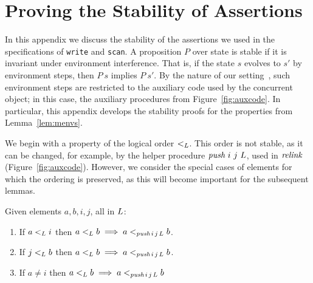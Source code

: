 \section{Proving the Stability of Assertions}
\label{sc:coq-code}

\def\cat{{\mathrel{+\!\!+}}}

\begin{comment}
\begin{itemize}
\item Describe stability proofs in general
\item Show Push mono Lemma in roder to justify $\tle$ not being
       stable, we will use this lemma later on
\item Present the {\sf Prefix} lemma connecting the
  $\chainjleq{t}{\ordlist}$ to $\chaintleq{t}{\ordlist}$
\item Present the {\sf Prefix} lemma connecting the
       $H^{\hbox{}\sqsubseteq_\ordlist t}$

\end{itemize}
\end{comment}

In this appendix we discuss the stability of the assertions we used in
the specifications of {\tt write} and {\tt scan}. A proposition $P$
over state is stable if it is invariant under environment
interference. That is, if the state $s$ evolves to $s'$ by environment
steps, then $P\ s$ implies $P\ s'$. By the nature of our
setting~\cite{Nanevski-al:ESOP14}, such environment steps are
restricted to the auxiliary code used by the concurrent object; in
this case, the auxiliary procedures from Figure~\ref{fig:auxcode}. In
particular, this appendix develops the stability proofs for the
properties from Lemma~\ref{lem:menvs}.

We begin with a property of the logical order $\mathrel{<_L}$. This order is
not stable, as it can be changed, for example, by the helper procedure
$\textit{push}\ i\ j\ L$, used in $\textit{relink}$
(Figure~\ref{fig:auxcode}). However, we consider the special cases of
elements for which the ordering is preserved, as this will become
important for the subsequent lemmas.



\begin{lemma}\label{lem:push-mono}
Given elements $a, b, i, j$, all in $L$:
\begin{enumerate}
\item\label{lem:push:left} If $a \mathrel{<_L} i$ then $ a \mathrel{<_L} b \implies a
  <_{\textit{push}\, i\, j\, L} b$. 
\item\label{lem:push:right} If $j \mathrel{<_L} b$ then $ a \mathrel{<_L} b \implies a
  <_{\textit{push}\, i\, j\, L} b $.
\item\label{lem:push:window} If $a \neq i$ then $ a \mathrel{<_L} b \implies a
  <_{\textit{push}\, i\, j\, L} b $
\end{enumerate}
\end{lemma}

